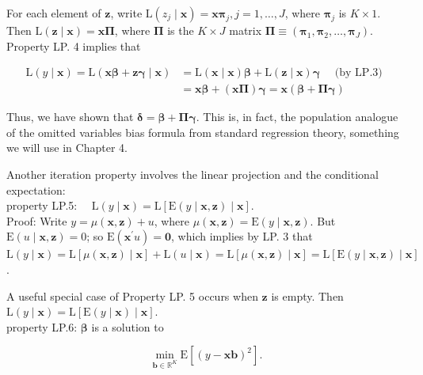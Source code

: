 \documentclass[10pt]{article}
\begin{document}
For each element of $\mathbf{z}$, write $\mathrm{L}\left(z_{j} \mid \mathbf{x}\right)=\mathbf{x} \boldsymbol{\pi}_{j}, j=1, \ldots, J$, where $\boldsymbol{\pi}_{j}$ is $K \times 1$. Then $\mathrm{L}(\mathbf{z} \mid \mathbf{x})=\mathbf{x} \boldsymbol{\Pi}$, where $\boldsymbol{\Pi}$ is the $K \times J$ matrix $\boldsymbol{\Pi} \equiv\left(\boldsymbol{\pi}_{1}, \boldsymbol{\pi}_{2}, \ldots, \boldsymbol{\pi}_{J}\right)$. Property LP. 4 implies that


\begin{align*}
\mathrm{L}(y \mid \mathbf{x})=\mathrm{L}(\mathbf{x} \boldsymbol{\beta}+\mathbf{z} \boldsymbol{\gamma} \mid \mathbf{x}) & =\mathrm{L}(\mathbf{x} \mid \mathbf{x}) \boldsymbol{\beta}+\mathrm{L}(\mathbf{z} \mid \mathbf{x}) \boldsymbol{\gamma} \quad \text { (by LP.3) } \\
& =\mathbf{x} \boldsymbol{\beta}+(\mathbf{x} \boldsymbol{\Pi}) \boldsymbol{\gamma}=\mathbf{x}(\boldsymbol{\beta}+\boldsymbol{\Pi} \boldsymbol{\gamma}) \tag{2.50}
\end{align*}


Thus, we have shown that $\boldsymbol{\delta}=\boldsymbol{\beta}+\boldsymbol{\Pi} \boldsymbol{\gamma}$. This is, in fact, the population analogue of the omitted variables bias formula from standard regression theory, something we will use in Chapter 4.

Another iteration property involves the linear projection and the conditional expectation:\\
property LP.5: $\quad \mathrm{L}(y \mid \mathbf{x})=\mathrm{L}[\mathrm{E}(y \mid \mathbf{x}, \mathbf{z}) \mid \mathbf{x}]$.\\
Proof: Write $y=\mu(\mathbf{x}, \mathbf{z})+u$, where $\mu(\mathbf{x}, \mathbf{z})=\mathrm{E}(y \mid \mathbf{x}, \mathbf{z})$. But $\mathrm{E}(u \mid \mathbf{x}, \mathbf{z})=0$; so $\mathrm{E}\left(\mathbf{x}^{\prime} u\right)=\mathbf{0}$, which implies by LP. 3 that $\mathrm{L}(y \mid \mathbf{x})=\mathrm{L}[\mu(\mathbf{x}, \mathbf{z}) \mid \mathbf{x}]+\mathrm{L}(u \mid \mathbf{x})= \mathrm{L}[\mu(\mathbf{x}, \mathbf{z}) \mid \mathbf{x}]=\mathrm{L}[\mathrm{E}(y \mid \mathbf{x}, \mathbf{z}) \mid \mathbf{x}]$.

A useful special case of Property LP. 5 occurs when $\mathbf{z}$ is empty. Then $\mathrm{L}(y \mid \mathbf{x})= \mathrm{L}[\mathrm{E}(y \mid \mathbf{x}) \mid \mathbf{x}]$.\\
property LP.6: $\boldsymbol{\beta}$ is a solution to


\begin{equation*}
\min _{\mathbf{b} \in \mathbb{R}^{K}} \mathrm{E}\left[(y-\mathbf{x b})^{2}\right] . \tag{2.51}
\end{equation*}
\end{document}
